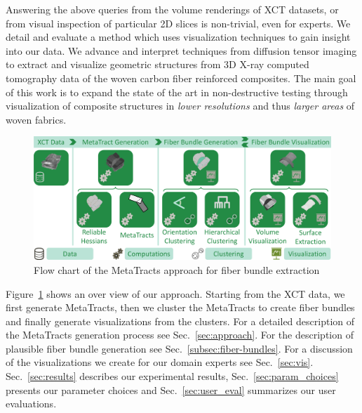 Answering the above queries from the volume renderings of XCT datasets, or from visual inspection of particular 2D slices is non-trivial, even for experts. We detail and evaluate a method which uses visualization techniques to gain insight into our data.
We advance and interpret techniques from diffusion tensor imaging to extract and visualize geometric structures from 3D X-ray computed tomography data of the woven carbon fiber reinforced composites. The main goal of this work is to expand the state of the art in non-destructive testing through visualization of composite structures in \textit{lower resolutions} and thus \textit{larger areas} of woven fabrics.
\begin{figure}[tb]
	\centering
	\includegraphics[width=\linewidth]{images_pvis/workflow.pdf}
	\caption{Flow chart of the MetaTracts approach for fiber bundle extraction}
	\label{fig:flowchart}
\end{figure}
Figure~\ref{fig:flowchart} shows an over view of our approach. Starting from the XCT data, we first generate MetaTracts, then we cluster the MetaTracts to create fiber bundles and finally generate visualizations from the clusters. For a detailed description of the MetaTracts generation process see Sec.~\ref{sec:approach}. For the description of plausible fiber bundle generation see Sec.~\ref{subsec:fiber-bundles}. For a discussion of the visualizations we create for our domain experts see Sec.~\ref{sec:vis}. Sec.~\ref{sec:results} describes our experimental results, Sec.~\ref{sec:param_choices} presents our parameter choices and  Sec.~\ref{sec:user_eval} summarizes our user evaluations.




